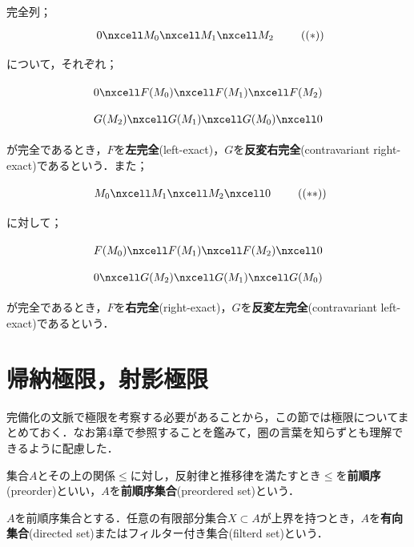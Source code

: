 完全列；
\[\begin{tikzcd}
	0\nxcell M_0\nxcell M_1\nxcell M_2 
\end{tikzcd}\tag{$(\ast)$}\]

について，それぞれ；

\[\begin{tikzcd}
	0\nxcell F(M_0)\nxcell F(M_1)\nxcell F(M_2)
\end{tikzcd}\]
\[\begin{tikzcd}
	G(M_2)\nxcell G(M_1)\nxcell G(M_0)\nxcell 0
\end{tikzcd}\]

が完全であるとき，$F$を\textbf{左完全}(left-exact)，$G$を\textbf{反変右完全}(contravariant right-exact)であるという．また；

\[\begin{tikzcd}
	M_0\nxcell M_1\nxcell M_2\nxcell0
\end{tikzcd}\tag{$(\ast\ast)$}\]

に対して；

\[\begin{tikzcd}
	F(M_0)\nxcell F(M_1)\nxcell F(M_2)\nxcell0
\end{tikzcd}\]
\[\begin{tikzcd}
	0\nxcell G(M_2)\nxcell G(M_1)\nxcell G(M_0)
\end{tikzcd}\]

が完全であるとき，$F$を\textbf{右完全}(right-exact)，$G$を\textbf{反変左完全}(contravariant left-exact)であるという．

\section{帰納極限，射影極限}

完備化の文脈で極限を考察する必要があることから，この節では極限についてまとめておく．なお第4章で参照することを鑑みて，圏の言葉を知らずとも理解できるように配慮した．

\begin{defi}[前順序]
	集合$A$とその上の関係$\leq$に対し，反射律と推移律を満たすとき$\leq$を\textbf{前順序}(preorder)といい，$A$を\textbf{前順序集合}(preordered set)という．
\end{defi}
\begin{defi}[有向集合]
	$A$を前順序集合とする．任意の有限部分集合$X\subset A$が上界を持つとき，$A$を\textbf{有向集合}(directed set)またはフィルター付き集合(filterd set)という．
\end{defi}

